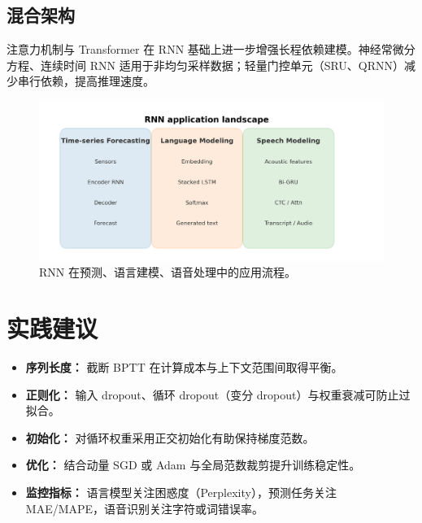 ﻿\documentclass[UTF8,zihao=-4]{ctexart}
\begin{document}
\subsection{混合架构}
注意力机制与 Transformer 在 RNN 基础上进一步增强长程依赖建模。神经常微分方程、连续时间 RNN 适用于非均匀采样数据；轻量门控单元（SRU、QRNN）减少串行依赖，提高推理速度。

\begin{figure}[H]
  \centering
  \includegraphics[width=0.85\linewidth]{rnn_applications_overview.png}
  \caption{RNN 在预测、语言建模、语音处理中的应用流程。}
  \label{fig:rnn_applications_cn}
\end{figure}
\FloatBarrier

\section{实践建议}
\begin{itemize}
  \item \textbf{序列长度：} 截断 BPTT 在计算成本与上下文范围间取得平衡。\item \textbf{正则化：} 输入 dropout、循环 dropout（变分 dropout）与权重衰减可防止过拟合。\item \textbf{初始化：} 对循环权重采用正交初始化有助保持梯度范数。\item \textbf{优化：} 结合动量 SGD 或 Adam 与全局范数裁剪提升训练稳定性。\item \textbf{监控指标：} 语言模型关注困惑度（Perplexity），预测任务关注 MAE/MAPE，语音识别关注字符或词错误率。\end{itemize}
\end{document}
